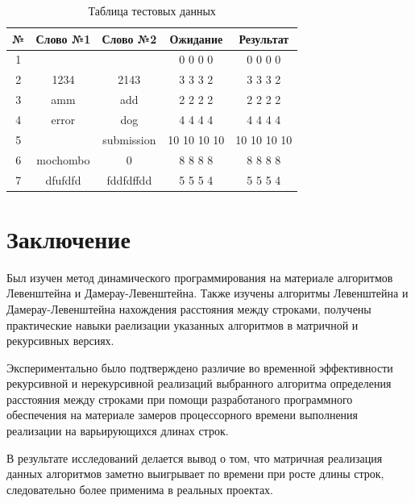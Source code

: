 \documentclass[12pt]{report}
\begin{document}
\begin{table} 
	\centering
	\caption{Таблица тестовых данных}
	\begin{tabular}{|c c c c c|} 
 	\hline
	№ & Слово №1 & Слово №2 & Ожидание & Результат \\ [0.8ex] 
 	\hline\hline
 	1 &  &  & 0 0 0 0 & 0 0 0 0\\
 	\hline
 	2 & 1234 & 2143 & 3 3 3 2 & 3 3 3 2\\
 	\hline
	3 & amm & add & 2 2 2 2 & 2 2 2 2\\
	\hline
	4 & error & dog & 4 4 4 4 & 4 4 4 4\\
	\hline
	5 &  & submission & 10 10 10 10 & 10 10 10 10\\
	\hline
	6 & mochombo & 0 & 8 8 8 8 & 8 8 8 8\\
	\hline
	7 & dfufdfd & fddfdffdd & 5 5 5 4  & 5 5 5 4\\
	\hline
	\end{tabular}
\end{table}



\chapter*{Заключение}
Был изучен метод динамического программирования на материале алгоритмов Левенштейна и Дамерау-Левенштейна.
Также изучены алгоритмы Левенштейна и Дамерау-Левенштейна нахождения расстояния между строками, получены практические навыки раелизации указанных алгоритмов
в матричной  и рекурсивных версиях. 

Экспериментально было подтверждено различие во временной эффективности рекурсивной и нерекурсивной реализаций выбранного алгоритма определения расстояния между строками при помощи разработаного программного обеспечения на материале замеров процессорного времени выполнения реализации на варьирующихся длинах строк. 

В результате исследований делается вывод о том, что матричная реализация данных алгоритмов заметно выигрывает по времени при росте длины строк, следовательно более применима в реальных проектах.

\nocite{*}
\end{document}
